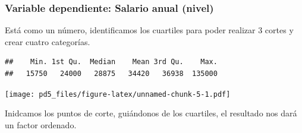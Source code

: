 \documentclass[
]{article}
\newenvironment{Shaded}{\begin{snugshade}}{\end{snugshade}}
\newcommand{\AttributeTok}[1]{\textcolor[rgb]{0.13,0.29,0.53}{#1}}
\newcommand{\DecValTok}[1]{\textcolor[rgb]{0.00,0.00,0.81}{#1}}
\newcommand{\FunctionTok}[1]{\textcolor[rgb]{0.13,0.29,0.53}{\textbf{#1}}}
\newcommand{\NormalTok}[1]{#1}
\newcommand{\OtherTok}[1]{\textcolor[rgb]{0.56,0.35,0.01}{#1}}
\newcommand{\SpecialCharTok}[1]{\textcolor[rgb]{0.81,0.36,0.00}{\textbf{#1}}}
\newcommand{\StringTok}[1]{\textcolor[rgb]{0.31,0.60,0.02}{#1}}
\begin{document}
\hypertarget{variable-dependiente-salario-anual-nivel}{%
\subsubsection{Variable dependiente: Salario anual
(nivel)}\label{variable-dependiente-salario-anual-nivel}}

Está como un número, identificamos los cuartiles para poder realizar 3
cortes y crear cuatro categorías.

\begin{Shaded}
\end{Shaded}

\begin{verbatim}
##    Min. 1st Qu.  Median    Mean 3rd Qu.    Max. 
##   15750   24000   28875   34420   36938  135000
\end{verbatim}

\begin{Shaded}
\end{Shaded}

\texttt{[image: pd5\_files/figure-latex/unnamed-chunk-5-1.pdf]}

Inidcamos los puntos de corte, guiándonos de los cuartiles, el resultado
nos dará un factor ordenado.

\begin{Shaded}
\end{Shaded}
\end{document}
